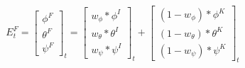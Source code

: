 \begin{equation} E^F_t = 
	\begin{bmatrix}  \phi^F \\  \theta^F \\  \psi^F \end{bmatrix}_t = 
	\begin{bmatrix} w_\phi * \phi^I \\ w_\theta * \theta^I \\ w_\psi * \psi^I \end{bmatrix}_t + 
	\begin{bmatrix} (1-w_\phi) * \phi^K \\ (1-w_\theta) * \theta^K \\ (1-w_\psi) * \psi^K \end{bmatrix}_t
	\label{eq:hybrid:reliableFusion}
\end{equation}
										
